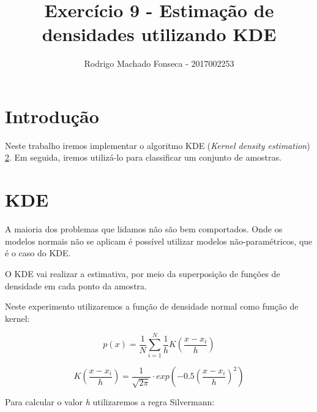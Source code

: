 \documentclass[12pt]{article}
\begin{document}

\pagestyle{fancy}
\fancyhf{}
\renewcommand{\headrulewidth}{0.4pt}
\fancyfoot[C]{\thepage}
\renewcommand{\footrulewidth}{0.4pt}
\fancyfoot[C]{\thepage}
\title{\LARGE \bf
 Exercício 9 - Estimação de densidades utilizando KDE}
\author{ Rodrigo Machado Fonseca - 2017002253}
\thispagestyle{fancy}
\maketitle
\thispagestyle{fancy}

\section{Introdução}
   \par Neste trabalho iremos implementar o algoritmo KDE (\textit{Kernel  density estimation}) \ref{KDE}. Em seguida, iremos utilizá-lo para classificar um conjunto de amostras.
   
\section{KDE}
  \label{KDE}
  \par A maioria dos problemas que lidamos não são bem comportados. Onde os modelos normais não se aplicam é possível utilizar modelos não-paramétricos, que é o caso do KDE.
  
  \par O KDE vai realizar a estimativa, por meio da superposição de funções de densidade em cada ponto da amostra.
  
  \par Neste experimento utilizaremos a função de densidade normal como função de kernel:
  
  \begin{equation}
  p(x) = \frac{1}{N}\sum_{i=1}^{N}\frac{1}{h}K(\frac{x-x_i}{h})
  \end{equation}
  
  \begin{equation}
  K(\frac{x-x_i}{h}) = \frac{1}{\sqrt{2\pi}}\cdot exp(-0.5(\frac{x-x_i}{h})^2)
  \end{equation}
  
  \par Para calcular o valor \textit{h} utilizaremos a regra  Silvermann:
  
\end{document}
